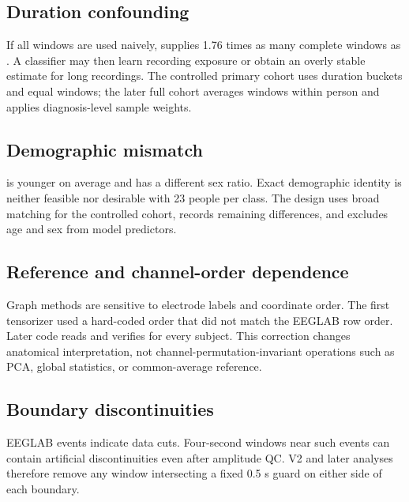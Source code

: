 \subsection{Duration confounding}

If all windows are used naively, \AD{} supplies 1.76 times as many complete
windows as \FTD{}. A classifier may then learn recording exposure or obtain an
overly stable estimate for long recordings. The controlled primary cohort uses
duration buckets and equal windows; the later full cohort averages windows
within person and applies diagnosis-level sample weights.

\subsection{Demographic mismatch}

\FTD{} is younger on average and has a different sex ratio. Exact demographic
identity is neither feasible nor desirable with 23 people per class. The design
uses broad matching for the controlled cohort, records remaining differences,
and excludes age and sex from model predictors.

\subsection{Reference and channel-order dependence}

Graph methods are sensitive to electrode labels and coordinate order. The first
tensorizer used a hard-coded order that did not match the EEGLAB row order.
Later code reads and verifies  for every subject. This correction
changes anatomical interpretation, not channel-permutation-invariant operations
such as PCA, global statistics, or common-average reference.

\subsection{Boundary discontinuities}

EEGLAB  events indicate data cuts. Four-second windows near such
events can contain artificial discontinuities even after amplitude QC. V2 and
later analyses therefore remove any window intersecting a fixed 0.5 s guard on
either side of each boundary.


